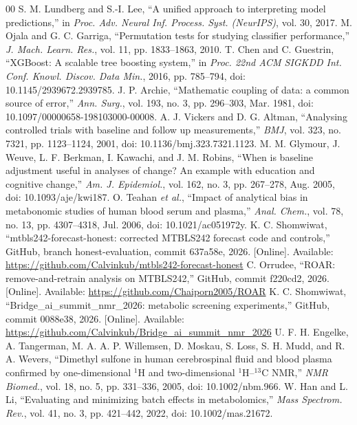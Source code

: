 \documentclass[conference]{IEEEtran}
\begin{document}
\begin{thebibliography}{00}
 S. M. Lundberg and S.-I. Lee, ``A unified approach to interpreting model predictions,'' in \textit{Proc. Adv. Neural Inf. Process. Syst. (NeurIPS)}, vol. 30, 2017.
 M. Ojala and G. C. Garriga, ``Permutation tests for studying classifier performance,'' \textit{J. Mach. Learn. Res.}, vol. 11, pp. 1833--1863, 2010.
 T. Chen and C. Guestrin, ``XGBoost: A scalable tree boosting system,'' in \textit{Proc. 22nd ACM SIGKDD Int. Conf. Knowl. Discov. Data Min.}, 2016, pp. 785--794, doi: 10.1145/2939672.2939785.
 J. P. Archie, ``Mathematic coupling of data: a common source of error,'' \textit{Ann. Surg.}, vol. 193, no. 3, pp. 296--303, Mar. 1981, doi: 10.1097/00000658-198103000-00008.
 A. J. Vickers and D. G. Altman, ``Analysing controlled trials with baseline and follow up measurements,'' \textit{BMJ}, vol. 323, no. 7321, pp. 1123--1124, 2001, doi: 10.1136/bmj.323.7321.1123.
 M. M. Glymour, J. Weuve, L. F. Berkman, I. Kawachi, and J. M. Robins, ``When is baseline adjustment useful in analyses of change? An example with education and cognitive change,'' \textit{Am. J. Epidemiol.}, vol. 162, no. 3, pp. 267--278, Aug. 2005, doi: 10.1093/aje/kwi187.
 O. Teahan \textit{et al.}, ``Impact of analytical bias in metabonomic studies of human blood serum and plasma,'' \textit{Anal. Chem.}, vol. 78, no. 13, pp. 4307--4318, Jul. 2006, doi: 10.1021/ac051972y.
 K. C. Shomwiwat, ``mtbls242-forecast-honest: corrected MTBLS242 forecast code and controls,'' GitHub, branch honest-evaluation, commit 637a58e, 2026. [Online]. Available: \url{https://github.com/Calvinkub/mtbls242-forecast-honest}
 C. Orrudee, ``ROAR: remove-and-retrain analysis on MTBLS242,'' GitHub, commit f220cd2, 2026. [Online]. Available: \url{https://github.com/Chaiporn2005/ROAR}
 K. C. Shomwiwat, ``Bridge\_ai\_summit\_nmr\_2026: metabolic screening experiments,'' GitHub, commit 0088e38, 2026. [Online]. Available: \url{https://github.com/Calvinkub/Bridge_ai_summit_nmr_2026}
 U. F. H. Engelke, A. Tangerman, M. A. A. P. Willemsen, D. Moskau, S. Loss, S. H. Mudd, and R. A. Wevers, ``Dimethyl sulfone in human cerebrospinal fluid and blood plasma confirmed by one-dimensional $^1$H and two-dimensional $^1$H--$^{13}$C NMR,'' \textit{NMR Biomed.}, vol. 18, no. 5, pp. 331--336, 2005, doi: 10.1002/nbm.966.
 W. Han and L. Li, ``Evaluating and minimizing batch effects in metabolomics,'' \textit{Mass Spectrom. Rev.}, vol. 41, no. 3, pp. 421--442, 2022, doi: 10.1002/mas.21672.

\end{thebibliography}
\end{document}
